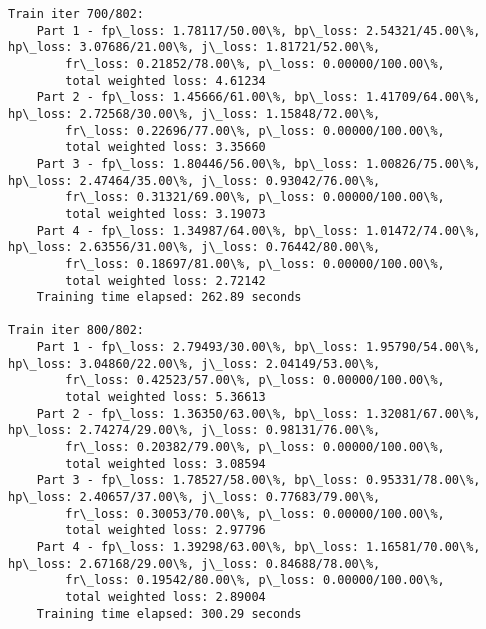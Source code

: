\documentclass[11pt]{article}
\begin{document}
\begin{Verbatim}[commandchars=\\\{\}]
Train iter 700/802:
	Part 1 - fp\_loss: 1.78117/50.00\%, bp\_loss: 2.54321/45.00\%, hp\_loss: 3.07686/21.00\%, j\_loss: 1.81721/52.00\%, 
		fr\_loss: 0.21852/78.00\%, p\_loss: 0.00000/100.00\%, 
		total weighted loss: 4.61234
	Part 2 - fp\_loss: 1.45666/61.00\%, bp\_loss: 1.41709/64.00\%, hp\_loss: 2.72568/30.00\%, j\_loss: 1.15848/72.00\%, 
		fr\_loss: 0.22696/77.00\%, p\_loss: 0.00000/100.00\%, 
		total weighted loss: 3.35660
	Part 3 - fp\_loss: 1.80446/56.00\%, bp\_loss: 1.00826/75.00\%, hp\_loss: 2.47464/35.00\%, j\_loss: 0.93042/76.00\%, 
		fr\_loss: 0.31321/69.00\%, p\_loss: 0.00000/100.00\%, 
		total weighted loss: 3.19073
	Part 4 - fp\_loss: 1.34987/64.00\%, bp\_loss: 1.01472/74.00\%, hp\_loss: 2.63556/31.00\%, j\_loss: 0.76442/80.00\%, 
		fr\_loss: 0.18697/81.00\%, p\_loss: 0.00000/100.00\%, 
		total weighted loss: 2.72142
	Training time elapsed: 262.89 seconds

Train iter 800/802:
	Part 1 - fp\_loss: 2.79493/30.00\%, bp\_loss: 1.95790/54.00\%, hp\_loss: 3.04860/22.00\%, j\_loss: 2.04149/53.00\%, 
		fr\_loss: 0.42523/57.00\%, p\_loss: 0.00000/100.00\%, 
		total weighted loss: 5.36613
	Part 2 - fp\_loss: 1.36350/63.00\%, bp\_loss: 1.32081/67.00\%, hp\_loss: 2.74274/29.00\%, j\_loss: 0.98131/76.00\%, 
		fr\_loss: 0.20382/79.00\%, p\_loss: 0.00000/100.00\%, 
		total weighted loss: 3.08594
	Part 3 - fp\_loss: 1.78527/58.00\%, bp\_loss: 0.95331/78.00\%, hp\_loss: 2.40657/37.00\%, j\_loss: 0.77683/79.00\%, 
		fr\_loss: 0.30053/70.00\%, p\_loss: 0.00000/100.00\%, 
		total weighted loss: 2.97796
	Part 4 - fp\_loss: 1.39298/63.00\%, bp\_loss: 1.16581/70.00\%, hp\_loss: 2.67168/29.00\%, j\_loss: 0.84688/78.00\%, 
		fr\_loss: 0.19542/80.00\%, p\_loss: 0.00000/100.00\%, 
		total weighted loss: 2.89004
	Training time elapsed: 300.29 seconds


\end{Verbatim}
\end{document}
